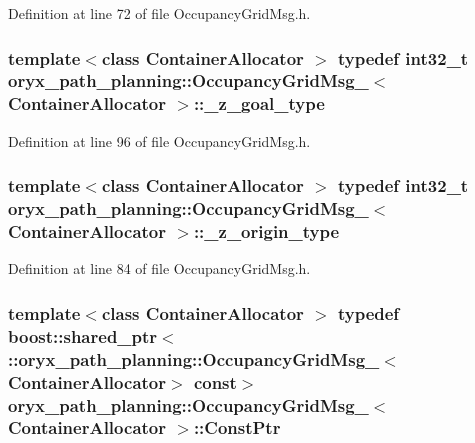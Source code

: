 \-Definition at line 72 of file \-Occupancy\-Grid\-Msg.\-h.

\subsubsection[{\-\_\-z\-\_\-goal\-\_\-type}]{\setlength{\rightskip}{0pt plus 5cm}template$<$class Container\-Allocator $>$ typedef int32\-\_\-t {\bf oryx\-\_\-path\-\_\-planning\-::\-Occupancy\-Grid\-Msg\-\_\-}$<$ \-Container\-Allocator $>$\-::{\bf \-\_\-z\-\_\-goal\-\_\-type}}\label{structoryx__path__planning_1_1OccupancyGridMsg___a82db4c02a6fc0c376a78390df8d61f4d}


\-Definition at line 96 of file \-Occupancy\-Grid\-Msg.\-h.

\subsubsection[{\-\_\-z\-\_\-origin\-\_\-type}]{\setlength{\rightskip}{0pt plus 5cm}template$<$class Container\-Allocator $>$ typedef int32\-\_\-t {\bf oryx\-\_\-path\-\_\-planning\-::\-Occupancy\-Grid\-Msg\-\_\-}$<$ \-Container\-Allocator $>$\-::{\bf \-\_\-z\-\_\-origin\-\_\-type}}\label{structoryx__path__planning_1_1OccupancyGridMsg___a8d62d207bd4494dc02daf2532986a9ad}


\-Definition at line 84 of file \-Occupancy\-Grid\-Msg.\-h.

\subsubsection[{\-Const\-Ptr}]{\setlength{\rightskip}{0pt plus 5cm}template$<$class Container\-Allocator $>$ typedef boost\-::shared\-\_\-ptr$<$ \-::{\bf oryx\-\_\-path\-\_\-planning\-::\-Occupancy\-Grid\-Msg\-\_\-}$<$\-Container\-Allocator$>$ const$>$ {\bf oryx\-\_\-path\-\_\-planning\-::\-Occupancy\-Grid\-Msg\-\_\-}$<$ \-Container\-Allocator $>$\-::{\bf \-Const\-Ptr}}\label{structoryx__path__planning_1_1OccupancyGridMsg___aed8803682a3af92fc2e9752b1f865519}


